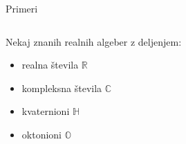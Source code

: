 \documentclass{beamer}
\begin{document}
\begin{frame}{Primeri}

	
\begin{columns}
\begin{column}{.48\textwidth}

	Nekaj znanih realnih algeber z deljenjem:
	\begin{itemize}
	\item  realna števila $\mathbb{R}$
	\item  kompleksna števila $\mathbb{C}$
	\item  kvaternioni $\mathbb{H}$
	\item  oktonioni $\mathbb{O}$	
	\end{itemize}

\end{column}%
\hfill%
\begin{column}{.48\textwidth}

%
%


\end{column}%
\end{columns}	
	

\end{frame}
\end{document}
